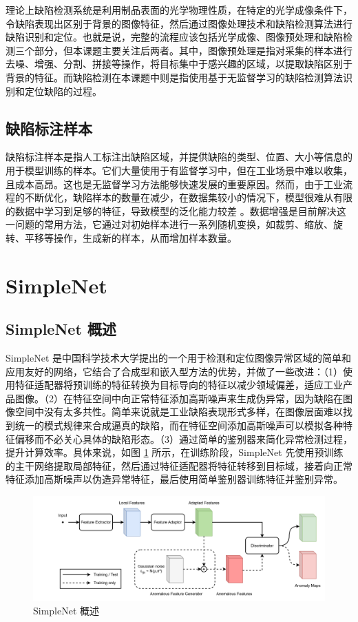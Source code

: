 \documentclass[
  ]{njuthesis}
\begin{document}
理论上缺陷检测系统是利用制品表面的光学物理性质，在特定的光学成像条件下，令缺陷表现出区别于背景的图像特征，然后通过图像处理技术和缺陷检测算法进行缺陷识别和定位\cite{[11]}。也就是说，完整的流程应该包括光学成像、图像预处理和缺陷检测三个部分，但本课题主要关注后两者。其中，图像预处理是指对采集的样本进行去噪、增强、分割、拼接等操作，将目标集中于感兴趣的区域，以提取缺陷区别于背景的特征。而缺陷检测在本课题中则是指使用基于无监督学习的缺陷检测算法识别和定位缺陷的过程。

\subsection{缺陷标注样本}

缺陷标注样本是指人工标注出缺陷区域，并提供缺陷的类型、位置、大小等信息的用于模型训练的样本。它们大量使用于有监督学习中，但在工业场景中难以收集，且成本高昂。这也是无监督学习方法能够快速发展的重要原因。然而，由于工业流程的不断优化，缺陷样本的数量在减少，在数据集较小的情况下，模型很难从有限的数据中学习到足够的特征，导致模型的泛化能力较差 \cite{[12]}。数据增强是目前解决这一问题的常用方法，它通过对初始样本进行一系列随机变换，如裁剪、缩放、旋转、平移等操作，生成新的样本，从而增加样本数量。

\section{SimpleNet}

\subsection{SimpleNet 概述}

SimpleNet\cite{[13]} 是中国科学技术大学提出的一个用于检测和定位图像异常区域的简单和应用友好的网络，它结合了合成型和嵌入型方法的优势，并做了一些改进：（1）使用特征适配器将预训练的特征转换为目标导向的特征以减少领域偏差，适应工业产品图像。（2）在特征空间中向正常特征添加高斯噪声来生成伪异常，因为缺陷在图像空间中没有太多共性。简单来说就是工业缺陷表现形式多样，在图像层面难以找到统一的模式规律来合成逼真的缺陷，而在特征空间添加高斯噪声可以模拟各种特征偏移而不必关心具体的缺陷形态。（3）通过简单的鉴别器来简化异常检测过程，提升计算效率。具体来说，如图 \ref{SimpleNet} 所示，在训练阶段，SimpleNet 先使用预训练的主干网络提取局部特征，然后通过特征适配器将特征转移到目标域，接着向正常特征添加高斯噪声以伪造异常特征，最后使用简单鉴别器训练特征并鉴别异常。

\begin{figure}[ht]
    \centering
    \includegraphics[width=\textwidth]{images/SimpleNet概述.png}
    \caption{SimpleNet 概述}
    \label{SimpleNet}
\end{figure}
\end{document}
